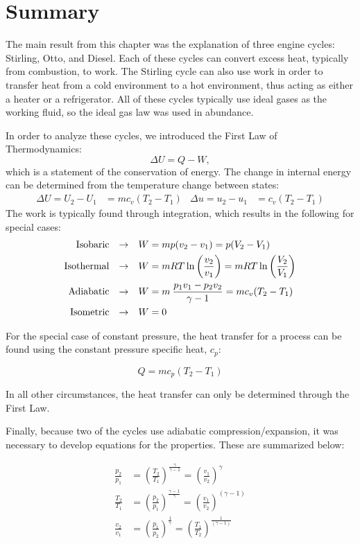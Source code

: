 \section{Summary}
The main result from this chapter was the explanation of three engine cycles: Stirling, Otto, and Diesel.  Each of these cycles can convert excess heat, typically from combustion, to work.  The Stirling cycle can also use work in order to transfer heat from a cold environment to a hot environment, thus acting as either a heater or a refrigerator.  All of these cycles typically use ideal gases as the working fluid, so the ideal gas law was used in abundance.

In order to analyze these cycles, we introduced the First Law of Thermodynamics:
\begin{equation*}
  \Delta U = Q - W,
\end{equation*}
which is a statement of the conservation of energy.  The change in internal energy can be determined from the temperature change between states:
\begin{align*}
  \Delta U = U_2 - U_1 &= m c_v (T_2 - T_1) & \Delta u = u_2 - u_1 &= c_v (T_2 - T_1)
\end{align*}
The work is typically found through integration, which results in the following for special cases:
\begin{align*}
  {\rm Isobaric} & &\rightarrow& & W &= mp (v_2 - v_1) = p(V_2 - V_1)\\
  {\rm Isothermal} & &\rightarrow& & W &= mRT \ln \left(\frac{v_2}{v_1}\right)  = mRT \ln \left(\frac{V_2}{V_1}\right)\\
  {\rm Adiabatic} & &\rightarrow& & W &= m\:\frac{p_1 v_1 - p_2 v_2}{\gamma - 1} = m c_v (T_2-T_1)\\
  {\rm Isometric} & &\rightarrow& & W &= 0
\end{align*}

For the special case of constant pressure, the heat transfer for a process can be found using the constant pressure specific heat, $c_p$:

\begin{equation*}
  Q = m c_p (T_2 - T_1)
\end{equation*}

In all other circumstances, the heat transfer can only be determined through the First Law.

Finally, because two of the cycles use adiabatic compression/expansion, it was necessary to develop equations for the properties.  These are summarized below:

\begin{align*}
  \frac{p_2}{p_1} &= \left(\frac{T_2}{T_1}\right)^{\frac{\gamma}{\gamma -1}} = \left(\frac{v_1}{v_2}\right)^{\gamma} \\
  \frac{T_2}{T_1} &= \left(\frac{p_2}{p_1}\right)^{\frac{\gamma-1}{\gamma}} = \left(\frac{v_1}{v_2}\right)^{(\gamma -1)} \\
  \frac{v_2}{v_1} &= \left(\frac{p_1}{p_2}\right)^{\frac{1}{\gamma}} = \left(\frac{T_1}{T_2}\right)^{\frac{1}{(\gamma -1)}}
\end{align*}
